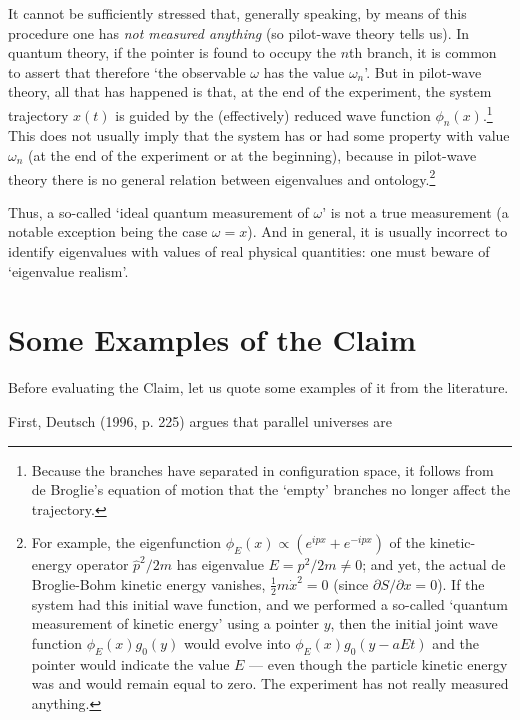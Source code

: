 \documentclass{article}%
\begin{document}
It cannot be sufficiently stressed that, generally speaking, by means of this
procedure one has \textit{not measured anything} (so pilot-wave theory tells
us). In quantum theory, if the pointer is found to occupy the $n$th branch, it
is common to assert that therefore `the observable $\omega$ has the value
$\omega_{n}$'. But in pilot-wave theory, all that has happened is that, at the
end of the experiment, the system trajectory $x(t)$ is guided by the
(effectively) reduced wave function $\phi_{n}(x)$.\footnote{Because the
branches have separated in configuration space, it follows from de Broglie's
equation of motion that the `empty' branches no longer affect the trajectory.}
This does not usually imply that the system has or had some property with
value $\omega_{n}$ (at the end of the experiment or at the beginning), because
in pilot-wave theory there is no general relation between eigenvalues and
ontology.\footnote{For example, the eigenfunction $\phi_{E}(x)\propto
(e^{ipx}+e^{-ipx})$ of the kinetic-energy operator $\hat{p}^{2}/2m$ has
eigenvalue $E=p^{2}/2m\neq0$; and yet, the actual de Broglie-Bohm kinetic
energy vanishes, ${\frac{1}{2}}m\dot{x}^{2}=0$ (since $\partial S/\partial
x=0$). If the system had this initial wave function, and we performed a
so-called `quantum measurement of kinetic energy' using a pointer $y$, then
the initial joint wave function $\phi_{E}(x)g_{0}(y)$ would evolve into
$\phi_{E}(x)g_{0}(y-aEt)$ and the pointer would indicate the value $E$ ---
even though the particle kinetic energy was and would remain equal to zero.
The experiment has not really measured anything.}

Thus, a so-called `ideal quantum measurement of $\omega$' is not a true
measurement (a notable exception being the case $\omega=x$). And in general,
it is usually incorrect to identify eigenvalues with values of real physical
quantities: one must beware of `eigenvalue realism'.

\section{Some Examples of the Claim}

Before evaluating the Claim, let us quote some examples of it from the literature.

First, Deutsch (1996, p. 225) argues that parallel universes are
\end{document}
